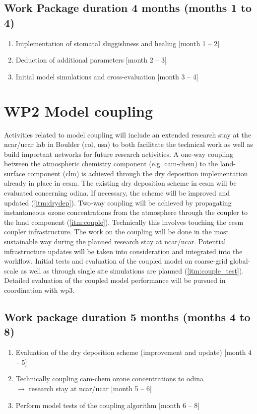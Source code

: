 \subsection*{Work Package duration 4 months (months 1 to 4)}
\begin{enumerate}[start=1,label={T1.\arabic*}]
  \itemsep0pt
\item Implementation of stomatal sluggishness and healing \hfill [month 1 -- 2]\label{itm:slugg}
\item Deduction of additional parameters \hfill [month 2 -- 3]\label{itm:para}
\item Initial model simulations and cross-evaluation \hfill [month 3 -- 4]\label{itm:init_sim}
\end{enumerate}

\section{WP2 Model coupling}
\label{sec:wp2}
Activities related to model coupling will include an extended research stay at the \gls{ncar/ucar} lab in Boulder (\acrshort{col}, \acrshort{usa}) to both facilitate the technical work as well as build important networks for future research activities. A one-way coupling between the atmospheric chemistry component (e.g. \gls{cam}-chem) to the land-surface component (\gls{clm}) is achieved through the dry deposition implementation already in place in \gls{cesm}. The existing dry deposition scheme in \gls{cesm} will be evaluated concerning \gls{odina}. If necessary, the scheme will be improved and updated (\ref{itm:drydep}). Two-way coupling will be achieved by propagating instantaneous ozone concentrations from the atmosphere through the coupler to the land component (\ref{itm:couple}). Technically this involves touching the \gls{cesm} coupler infrastructure. The work on the coupling will be done in the most sustainable way during the planned research stay at \gls{ncar/ucar}. Potential infrastructure updates will be taken into consideration and integrated into the workflow. Initial tests and evaluation of the coupled model on coarse-grid global-scale as well as through single site simulations are planned (\ref{itm:couple_test}). Detailed evaluation of the coupled model performance will be pursued in coordination with \gls{wp}3.
{
\subsection*{Work package duration 5 months (months 4 to 8)}
\begin{enumerate}[start=1,label={T2.\arabic*}]
  \itemsep0pt
\item Evaluation of the dry deposition scheme (improvement and update) \hfill [month 4 -- 5]\label{itm:drydep}
\item Technically coupling \gls{cam}-chem ozone concentrations to \gls{odina} \\$\rightarrow$ research stay at \gls{ncar/ucar} \hfill [month 5 -- 6]\label{itm:couple}
\item Perform model tests of the coupling algorithm \hfill [month 6 -- 8]\label{itm:couple_test}
\end{enumerate}
}

